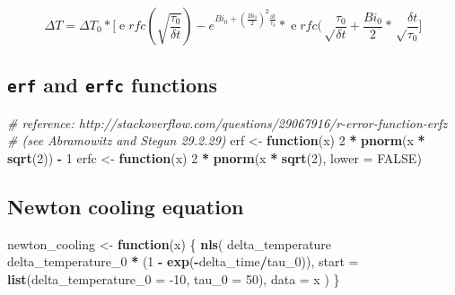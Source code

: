 \documentclass[]{book}
\newenvironment{Shaded}{\begin{snugshade}}{\end{snugshade}}
\newcommand{\CommentTok}[1]{\textcolor[rgb]{0.56,0.35,0.01}{\textit{#1}}}
\newcommand{\ControlFlowTok}[1]{\textcolor[rgb]{0.13,0.29,0.53}{\textbf{#1}}}
\newcommand{\DataTypeTok}[1]{\textcolor[rgb]{0.13,0.29,0.53}{#1}}
\newcommand{\DecValTok}[1]{\textcolor[rgb]{0.00,0.00,0.81}{#1}}
\newcommand{\KeywordTok}[1]{\textcolor[rgb]{0.13,0.29,0.53}{\textbf{#1}}}
\newcommand{\NormalTok}[1]{#1}
\newcommand{\OperatorTok}[1]{\textcolor[rgb]{0.81,0.36,0.00}{\textbf{#1}}}
\newcommand{\OtherTok}[1]{\textcolor[rgb]{0.56,0.35,0.01}{#1}}
\newcommand{\StringTok}[1]{\textcolor[rgb]{0.31,0.60,0.02}{#1}}
\begin{document}
\[\Delta T = \Delta T_0 * \big [ \operatorname erfc(\sqrt{\frac{\tau_0}{\delta t}}) - e^ {Bi_0 + (\frac {Bi_0}{2})^2 \frac {\delta t}{\tau_0}} * \operatorname erfc (\sqrt \frac{\tau_0}{\delta t} + \frac {Bi_0}{2} * \sqrt \frac{\delta t }{\tau_0} \big]\]

\hypertarget{erf-and-erfc-functions}{%
\subsection{\texorpdfstring{\texttt{erf} and \texttt{erfc} functions}{erf and erfc functions}}\label{erf-and-erfc-functions}}

\begin{Shaded}
\begin{Highlighting}[]
\CommentTok{# reference: http://stackoverflow.com/questions/29067916/r-error-function-erfz}
\CommentTok{# (see Abramowitz and Stegun 29.2.29)}
\NormalTok{erf <-}\StringTok{ }\ControlFlowTok{function}\NormalTok{(x) }\DecValTok{2} \OperatorTok{*}\StringTok{ }\KeywordTok{pnorm}\NormalTok{(x }\OperatorTok{*}\StringTok{ }\KeywordTok{sqrt}\NormalTok{(}\DecValTok{2}\NormalTok{)) }\OperatorTok{-}\StringTok{ }\DecValTok{1}
\NormalTok{erfc <-}\StringTok{ }\ControlFlowTok{function}\NormalTok{(x) }\DecValTok{2} \OperatorTok{*}\StringTok{ }\KeywordTok{pnorm}\NormalTok{(x }\OperatorTok{*}\StringTok{ }\KeywordTok{sqrt}\NormalTok{(}\DecValTok{2}\NormalTok{), }\DataTypeTok{lower =} \OtherTok{FALSE}\NormalTok{)}
\end{Highlighting}
\end{Shaded}

\hypertarget{newton-cooling-equation}{%
\subsection{Newton cooling equation}\label{newton-cooling-equation}}

\begin{Shaded}
\begin{Highlighting}[]
\NormalTok{newton_cooling <-}\StringTok{ }\ControlFlowTok{function}\NormalTok{(x) \{}
  \KeywordTok{nls}\NormalTok{(}
\NormalTok{    delta_temperature }\OperatorTok{~}\StringTok{ }\NormalTok{delta_temperature_}\DecValTok{0} \OperatorTok{*}\StringTok{ }\NormalTok{(}\DecValTok{1} \OperatorTok{-}\StringTok{ }\KeywordTok{exp}\NormalTok{(}\OperatorTok{-}\NormalTok{delta_time}\OperatorTok{/}\NormalTok{tau_}\DecValTok{0}\NormalTok{)),}
    \DataTypeTok{start =} \KeywordTok{list}\NormalTok{(}\DataTypeTok{delta_temperature_0 =} \DecValTok{-10}\NormalTok{, }\DataTypeTok{tau_0 =} \DecValTok{50}\NormalTok{),}
    \DataTypeTok{data =}\NormalTok{ x}
\NormalTok{  )}
\NormalTok{\}}
\end{Highlighting}
\end{Shaded}
\end{document}
